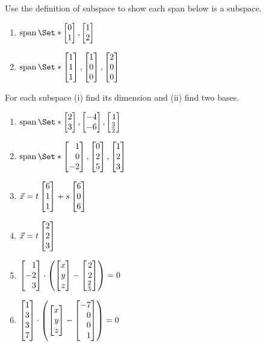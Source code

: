 \begin{exercises}
\begin{problist}
		\prob Use the definition of subspace to show each span below is a subspace.
		\begin{enumerate}
			\item $\Span\Set*{\mat{0\\1}, \mat{1\\2}}$
			\item $\Span\Set*{\mat{1\\1\\1}, \mat{1\\0\\0}, \mat{2\\0\\0}}$
		\end{enumerate}

		\prob For each subspace (i) find its dimension and (ii) find two bases.
		\begin{enumerate}
			\item $\Span\Set*{\mat{2\\3}, \mat{-4\\-6}, \mat{1\\\frac{3}{2}}}$
			\item $\Span\Set*{\mat{1\\0\\-2}, \mat{0\\2\\5}, \mat{1\\2\\3}}$
			\item $\vec x = t\mat{6\\1\\1}+s\mat{6\\0\\6}$
			\item $\vec x = t\mat{2\\2\\3}$
			\item $\mat{1\\-2\\3} \cdot \left(\mat{x\\y\\z}-\mat{2\\2\\\frac{2}{3}}\right)=0$
			\item $\mat{1\\3\\3\\7} \cdot \left(\mat{x\\y\\z}-\mat{-7\\0\\0\\1}\right)=0$
		\end{enumerate}


\end{problist}
\end{exercises}
